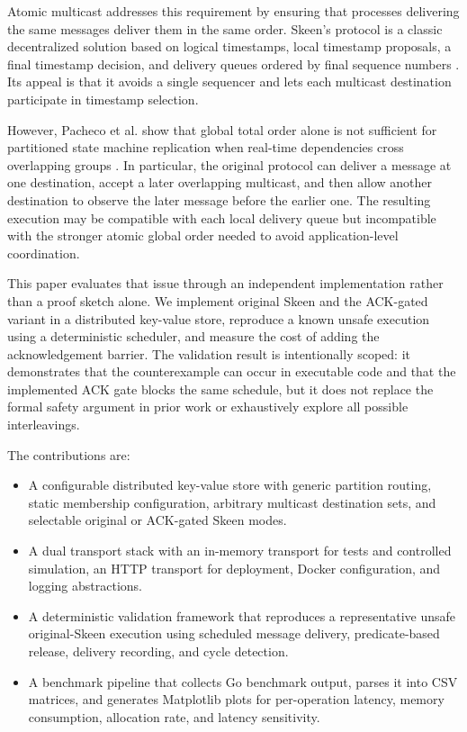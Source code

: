 \documentclass[conference]{IEEEtran}
\begin{document}
Atomic multicast addresses this requirement by ensuring that processes delivering the same messages deliver them in the same order. Skeen's protocol is a classic decentralized solution based on logical timestamps, local timestamp proposals, a final timestamp decision, and delivery queues ordered by final sequence numbers \cite{lamport,skeen}. Its appeal is that it avoids a single sequencer and lets each multicast destination participate in timestamp selection.

However, Pacheco et al. show that global total order alone is not sufficient for partitioned state machine replication when real-time dependencies cross overlapping groups \cite{pacheco}. In particular, the original protocol can deliver a message at one destination, accept a later overlapping multicast, and then allow another destination to observe the later message before the earlier one. The resulting execution may be compatible with each local delivery queue but incompatible with the stronger atomic global order needed to avoid application-level coordination.

This paper evaluates that issue through an independent implementation rather than a proof sketch alone. We implement original Skeen and the ACK-gated variant in a distributed key-value store, reproduce a known unsafe execution using a deterministic scheduler, and measure the cost of adding the acknowledgement barrier. The validation result is intentionally scoped: it demonstrates that the counterexample can occur in executable code and that the implemented ACK gate blocks the same schedule, but it does not replace the formal safety argument in prior work or exhaustively explore all possible interleavings.

The contributions are:
\begin{itemize}
    \item A configurable distributed key-value store with generic partition routing, static membership configuration, arbitrary multicast destination sets, and selectable original or ACK-gated Skeen modes.
    \item A dual transport stack with an in-memory transport for tests and controlled simulation, an HTTP transport for deployment, Docker configuration, and logging abstractions.
    \item A deterministic validation framework that reproduces a representative unsafe original-Skeen execution using scheduled message delivery, predicate-based release, delivery recording, and cycle detection.
    \item A benchmark pipeline that collects Go benchmark output, parses it into CSV matrices, and generates Matplotlib plots for per-operation latency, memory consumption, allocation rate, and latency sensitivity.
\end{itemize}
\end{document}
